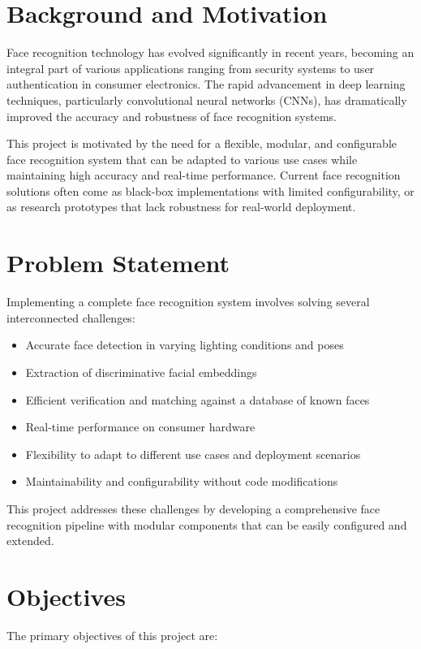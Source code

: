 \section{Background and Motivation}
Face recognition technology has evolved significantly in recent years, becoming an integral part of various applications ranging from security systems to user authentication in consumer electronics. The rapid advancement in deep learning techniques, particularly convolutional neural networks (CNNs), has dramatically improved the accuracy and robustness of face recognition systems.

This project is motivated by the need for a flexible, modular, and configurable face recognition system that can be adapted to various use cases while maintaining high accuracy and real-time performance. Current face recognition solutions often come as black-box implementations with limited configurability, or as research prototypes that lack robustness for real-world deployment.

\section{Problem Statement}
Implementing a complete face recognition system involves solving several interconnected challenges:
\begin{itemize}
    \item Accurate face detection in varying lighting conditions and poses
    \item Extraction of discriminative facial embeddings
    \item Efficient verification and matching against a database of known faces
    \item Real-time performance on consumer hardware
    \item Flexibility to adapt to different use cases and deployment scenarios
    \item Maintainability and configurability without code modifications
\end{itemize}

This project addresses these challenges by developing a comprehensive face recognition pipeline with modular components that can be easily configured and extended.

\section{Objectives}
The primary objectives of this project are:

